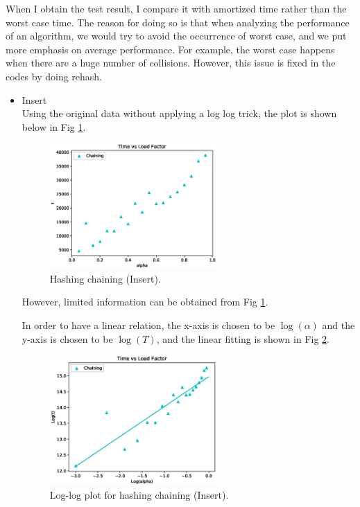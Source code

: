 \documentclass{article}
\begin{document}
\begin{spacing}{1.2}
When I obtain the test result, I compare it with amortized time rather than the worst case time. The reason for doing so is that when analyzing the performance of an algorithm, we would try to avoid the occurrence of worst case, and we put more emphasis on average performance. For example, the worst case happens when there are a huge number of collisions. However, this issue is fixed in the codes by doing rehash.  
\begin{itemize}
    \item Insert\\
    Using the original data without applying a log log trick, the plot is shown below in Fig \ref{chain-origin}.
    \begin{figure}[!htb]
        \centering
        \includegraphics[width=0.6\textwidth]{../output/fig/insert_original_chain.eps}
        \caption{Hashing chaining (Insert).}
        \label{chain-origin}
    \end{figure}

    However, limited information can be obtained from Fig \ref{chain-origin}.

    In order to have a linear relation, the x-axis is chosen to be $\log(\alpha)$ and the y-axis is chosen to be $\log(T)$, and the linear fitting is shown in Fig \ref{chain-insert}.
    \begin{figure}[!htb]
        \centering
        \includegraphics[width=0.6\textwidth]{../output/fig/insert_chain.eps}
        \caption{Log-log plot for hashing chaining (Insert).}
        \label{chain-insert}
    \end{figure}


\end{itemize}
\end{spacing}
\end{document}
